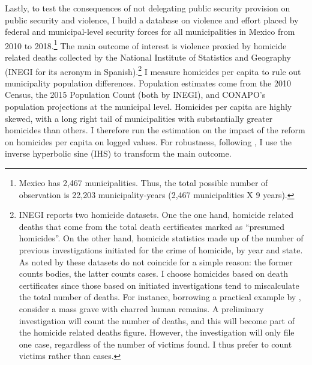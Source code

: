 \documentclass[12pt]{amsart}
\numberwithin{equation}{section}
\theoremstyle{definition}
\theoremstyle{definition}
\theoremstyle{definition}
\begin{document}
Lastly, to test the consequences of not delegating public security provision on public security and violence, I build a database on violence and effort placed by federal and municipal-level security forces for all municipalities in Mexico from 2010 to 2018.\footnote{Mexico has 2,467 municipalities. Thus, the total possible number of observation is 22,203 municipality-years (2,467 municipalities X 9 years).} The main outcome of interest is violence proxied by homicide related deaths collected by the National Institute of Statistics and Geography (INEGI for its acronym in Spanish).\footnote{INEGI reports two homicide datasets. One the one hand, homicide related deaths that come from the total death certificates marked as ``presumed homicides''. On the other hand, homicide statistics made up of the number of previous investigations initiated for the crime of homicide, by year and state. As noted by \citet{rivera_2012} these datasets do not coincide for a simple reason: the former counts bodies, the latter counts cases. I choose homicides based on death certificates since those based on initiated investigations tend to miscalculate the total number of deaths. For instance, borrowing a practical example by \citet{rivera_2012}, consider a mass grave with charred human remains. A preliminary investigation will count the number of deaths, and this will become part of the homicide related deaths figure. However, the investigation will only file one case, regardless of the number of victims found. I thus prefer to count victims rather than cases.} I measure homicides per capita to rule out municipality population differences. Population estimates come from the 2010 Census, the 2015 Population Count (both by INEGI), and CONAPO's population projections at the municipal level. Homicides per capita are highly skewed, with a long right tail of municipalities with substantially greater homicides than others. I therefore run the estimation on the impact of the reform on homicides per capita on logged values. For robustness, following \citet{mackinnon_maggie_1990}, I use the inverse hyperbolic sine (IHS) to transform the main outcome. %
\end{document}

